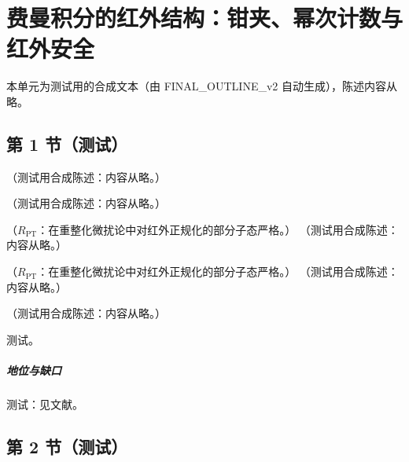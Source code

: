 \chapter{费曼积分的红外结构：钳夹、幂次计数与红外安全}\label{ch:ir}
本单元为测试用的合成文本（由 FINAL\_OUTLINE\_v2 自动生成），陈述内容从略。

\section{第 1 节（测试）}\label{sec:ir-landau}

\begin{definition}\label{def:ir-landau-setup}
（测试用合成陈述：内容从略。）
\end{definition}

\begin{lemma}[包络恒等式]\label{lem:ir-envelope}
（测试用合成陈述：内容从略。）
\end{lemma}

\begin{theorem}\label{thm:ir-landau-alpha}
（$R_{\mathrm{PT}}$：在重整化微扰论中对红外正规化的部分子态严格。）
（测试用合成陈述：内容从略。）
\end{theorem}

\begin{theorem}\label{thm:ir-landau-momentum}
（$R_{\mathrm{PT}}$：在重整化微扰论中对红外正规化的部分子态严格。）
（测试用合成陈述：内容从略。）
\end{theorem}

\begin{remark}\label{rem:ir-landau-status}
（测试用合成陈述：内容从略。）
\end{remark}
\begin{proofsketch}测试。\end{proofsketch}
\paragraph{地位与缺口}测试：见文献。

\section{第 2 节（测试）}\label{sec:ir-coleman-norton}

